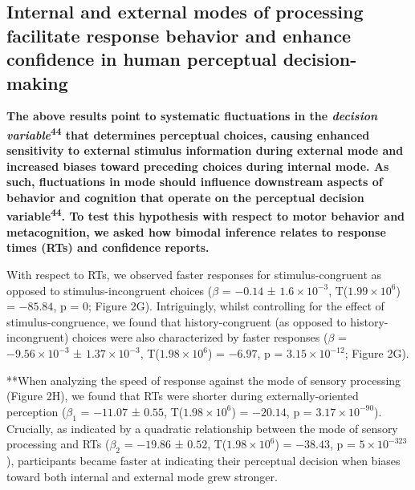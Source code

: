 \documentclass[
]{article}
\begin{document}
\hypertarget{internal-and-external-modes-of-processing-facilitate-response-behavior-and-enhance-confidence-in-human-perceptual-decision-making}{%
\subsection{Internal and external modes of processing facilitate
response behavior and enhance confidence in human perceptual
decision-making}\label{internal-and-external-modes-of-processing-facilitate-response-behavior-and-enhance-confidence-in-human-perceptual-decision-making}}

\textbf{The above results point to systematic fluctuations in the
\emph{decision variable}\textsuperscript{44} that determines perceptual
choices, causing enhanced sensitivity to external stimulus information
during external mode and increased biases toward preceding choices
during internal mode. As such, fluctuations in mode should influence
downstream aspects of behavior and cognition that operate on the
perceptual decision variable\textsuperscript{44}. To test this
hypothesis with respect to motor behavior and metacognition, we asked
how bimodal inference relates to response times (RTs) and confidence
reports.}

With respect to RTs, we observed faster responses for stimulus-congruent
as opposed to stimulus-incongruent choices (\(\beta\) = \(-0.14\) ±
\(\ensuremath{1.6\times 10^{-3}}\),
T(\(\ensuremath{1.99\times 10^{6}}\)) = \(-85.84\), p = \(0\); Figure
2G). Intriguingly, whilst controlling for the effect of
stimulus-congruence, we found that history-congruent (as opposed to
history-incongruent) choices were also characterized by faster responses
(\(\beta\) = \(\ensuremath{-9.56\times 10^{-3}}\) ±
\(\ensuremath{1.37\times 10^{-3}}\),
T(\(\ensuremath{1.98\times 10^{6}}\)) = \(-6.97\), p =
\(\ensuremath{3.15\times 10^{-12}}\); Figure 2G).

**When analyzing the speed of response against the mode of sensory
processing (Figure 2H), we found that RTs were shorter during
externally-oriented perception (\(\beta_1\) = \(-11.07\) ± \(0.55\),
T(\(\ensuremath{1.98\times 10^{6}}\)) = \(-20.14\), p =
\(\ensuremath{3.17\times 10^{-90}}\)). Crucially, as indicated by a
quadratic relationship between the mode of sensory processing and RTs
(\(\beta_2\) = \(-19.86\) ± \(0.52\),
T(\(\ensuremath{1.98\times 10^{6}}\)) = \(-38.43\), p =
\(\ensuremath{5\times 10^{-323}}\)), participants became faster at
indicating their perceptual decision when biases toward both internal
and external mode grew stronger.
\end{document}
